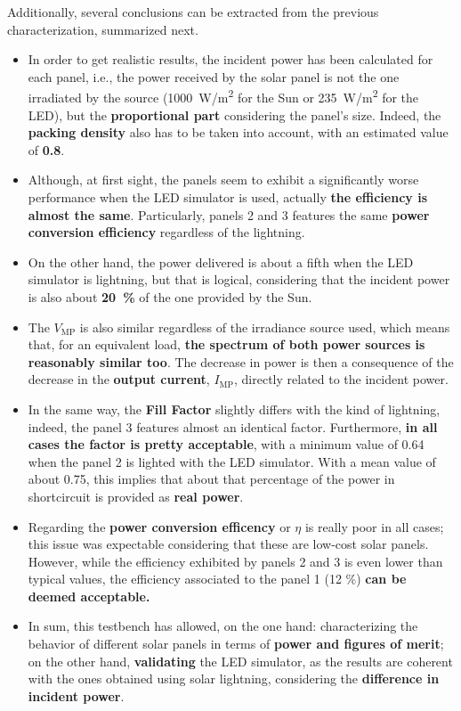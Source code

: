 Additionally, several conclusions can be extracted from the previous characterization, summarized next.



\begin{itemize} [topsep=0pt]
	
	\item In order to get realistic results, the incident power has been calculated for each panel, i.e., the power received by the solar panel is not the one irradiated by the source (\SI{1000}{W/m^2} for the Sun or \SI{235}{W/m^2} for the \acrshort{LED}), but the \textbf{proportional part} considering the panel's size. Indeed, the \textbf{packing density} also has to be taken into account, with an estimated value of \textbf{0.8}.
	\item Although, at first sight, the panels seem to exhibit a significantly worse performance when the \acrshort{LED} simulator is used, actually \textbf{the efficiency is almost the same}. Particularly, panels 2 and 3 features the same \textbf{power conversion efficiency} regardless of the lightning. 
	\item On the other hand, the power delivered is about a fifth when the \acrshort{LED} simulator is lightning, but that is logical, considering that the incident power is also about \textbf{20~\%} of the one provided by the Sun.
	\item The $V_{\text{MP}}$ is also similar regardless of the irradiance source used, which means that, for an equivalent load, \textbf{the spectrum of both power sources is reasonably similar too}. The decrease in power is then a consequence of the decrease in the \textbf{output current}, $I_{\text{MP}}$, directly related to the incident power. 
	\item In the same way, the \textbf{Fill Factor} slightly differs with the kind of lightning, indeed, the panel 3 features almost an identical factor. Furthermore, \textbf{in all cases the factor is pretty acceptable}, with a minimum value of 0.64 when the panel 2 is lighted with the \acrshort{LED} simulator. With a mean value of about 0.75, this implies that about that percentage of the power in shortcircuit is provided as \textbf{real power}. 
	\item Regarding the \textbf{power conversion efficency} or $\eta$ is really poor in all cases; this issue was expectable considering that these are low-cost solar panels. However, while the efficiency exhibited by panels 2 and 3 is even lower than typical values, the efficiency associated to the panel 1 (12 \%) \textbf{can be deemed acceptable.}
	
	\item In sum, this testbench has allowed, on the one hand: characterizing the behavior of different solar panels in terms of \textbf{power and figures of merit}; on the other hand, \textbf{validating} the \acrshort{LED} simulator, as the results are coherent with the ones obtained using solar lightning, considering the \textbf{difference in incident power}.
	
\end{itemize}

